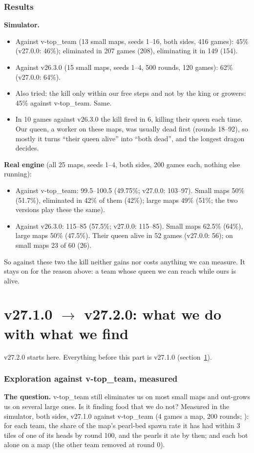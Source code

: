 \documentclass[11pt,a4paper]{article}
\newcommand{\code}[1]{\texttt{\detokenize{#1}}}
\begin{document}
\section{Results}\label{sec:qkillresults}
\textbf{Simulator.}
\begin{itemize}
  \item Against v-top\_team (13 small maps, seeds 1--16, both sides, 416 games): 45\% (v27.0.0: 46\%); eliminated in 207
        games (208), eliminating it in 149 (154).
  \item Against v26.3.0 (15 small maps, seeds 1--4, 500 rounds, 120 games): 62\% (v27.0.0: 64\%).
  \item Also tried: the kill only within our free steps and not by the king or growers: 45\% against v-top\_team. Same.
  \item In 10 games against v26.3.0 the kill fired in 6, killing their queen each time. Our queen, a worker on these maps,
        was usually dead first (rounds 18--92), so mostly it turns ``their queen alive'' into ``both dead'', and the
        longest dragon decides.
\end{itemize}
\textbf{Real engine} (all 25 maps, seeds 1--4, both sides, 200 games each, nothing else running):
\begin{itemize}
  \item Against v-top\_team: 99.5--100.5 (49.75\%; v27.0.0: 103--97). Small maps 50\% (51.7\%), eliminated in 42\% of them
        (42\%); large maps 49\% (51\%; the two versions play these the same).
  \item Against v26.3.0: 115--85 (57.5\%; v27.0.0: 115--85). Small maps 62.5\% (64\%), large maps 50\% (47.5\%). Their queen
        alive in 52 games (v27.0.0: 56); on small maps 23 of 60 (26).
\end{itemize}
So against these two the kill neither gains nor costs anything we can measure. It stays on for the reason above: a team
whose queen we can reach while ours is alive.

\part{v27.1.0 $\rightarrow$ v27.2.0: what we do with what we find}
v27.2.0 starts here. Everything before this part is v27.1.0 (section~\ref{sec:qkillresults}).

\section{Exploration against v-top\_team, measured}\label{sec:explore272}
\textbf{The question.} v-top\_team still eliminates us on most small maps and out-grows us on several large ones. Is it
finding food that we do not? Measured in the simulator, both sides, v27.1.0 against v-top\_team (4 games a map, 200
rounds; \code{bed_race2.py}): for each team, the share of the map's pearl-bed spawn rate it has had within 3 tiles of one
of its heads by round 100, and the pearls it ate by then; and each bot alone on a map (the other team removed at round 0).
\end{document}
